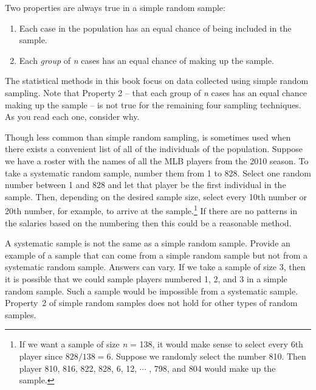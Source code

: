 Two properties are always true in a simple random sample:
\begin{enumerate}
\item Each case in the population has an equal chance of being included in the sample.
\item Each \emph{group} of \textit{n} cases has an equal chance of making up the sample.
\end{enumerate}

The statistical methods in this book focus on data collected using simple random sampling. Note that Property 2 -- that each group of \textit{n} cases has an equal chance making up the sample -- is not true for the remaining four sampling techniques. As you read each one, consider why.

Though less common than simple random sampling,  is sometimes used when there exists a convenient list of all of the individuals of the population. Suppose we have a roster with the names of all the MLB players from the 2010 season. To take a systematic random sample, number them from 1 to 828. Select one random number between 1 and 828 and let that player be the first individual in the sample. Then, depending on the desired sample size, select every 10th number or 20th number, for example, to arrive at the sample.\footnote{If we want a sample of size \textit{n} = 138, it would make sense to select every 6th player since \mbox{$828/138 = 6$.} Suppose we randomly select the number 810. Then player 810, 816, 822, 828, 6, 12, $\cdots$ , 798, and 804 would make up the sample.} If there are no patterns in the salaries based on the numbering then this could be a reasonable method.

\begin{examplewrap}
\begin{nexample}{A systematic sample is not the same as a simple random sample. Provide an example of a sample that can come from a simple random sample but not from a systematic random sample.}
Answers can vary. If we take a sample of size 3, then it is possible that we could sample players numbered 1, 2, and 3 in a simple random sample. Such a sample would be impossible from a systematic sample. Property~2 of simple random samples does not hold for other types of random samples.
\end{nexample}
\end{examplewrap}

